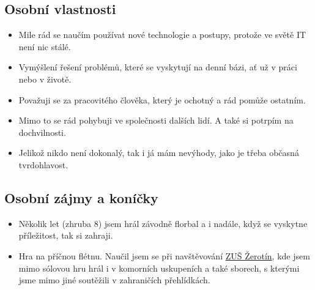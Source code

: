 \documentclass{article}
\begin{document}
\subsection*{Osobní vlastnosti}

\begin{itemize}
	\item Mile rád se naučím používat nové technologie a postupy, protože ve světě IT není nic stálé.
	\item Vymýšlení řešení problémů, které se vyskytují na denní bázi, ať už v práci nebo v životě.
	\item Považuji se za pracovitého člověka, který je ochotný a rád pomůže ostatním.
	\item Mimo to se rád pohybuji ve společnosti dalších lidí. A také si potrpím na dochvilnosti.
	\item Jelikož nikdo není dokonalý, tak i já mám nevýhody, jako je třeba občasná tvrdohlavost.
\end{itemize}

\subsection*{Osobní zájmy a koníčky}

\begin{itemize}
	\item Několik let (zhruba 8) jsem hrál závodně florbal a i nadále, když se vyskytne příležitost, tak si zahraji.
	\item Hra na příčnou flétnu. Naučil jsem se při navštěvování \href{https://www.zus-zerotin.cz/}{ZUŠ Žerotín}, kde jsem mimo sólovou hru hrál i v komorních uskupeních a také sborech, s kterými jsme mimo jiné soutěžili v zahraničích přehlídkách.
\end{itemize}
\end{document}
